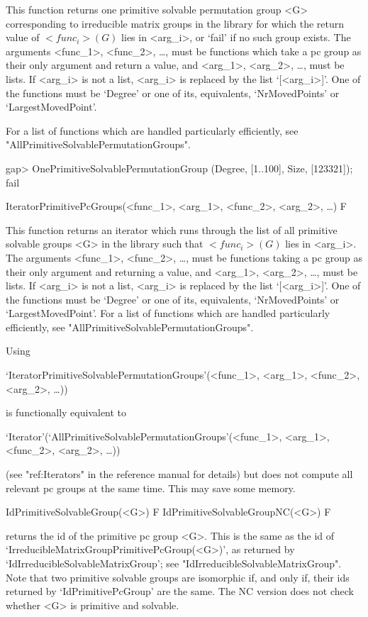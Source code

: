 This function returns one primitive solvable permutation
group <G> corresponding to irreducible matrix groups in the  {\IRREDSOL} library 
for which the return value of $<func_i>(G)$ lies in
<arg_i>, or `fail' if no such group exists.  The arguments <func_1>, <func_2>, \dots,
must be {\GAP} functions which take a pc group as their only argument and return a
value, and <arg_1>, <arg_2>,
\dots,  must be lists. If <arg_i> is not a list, <arg_i> is replaced by the list
`[<arg_i>]'. One of the functions must be `Degree' or one of its, equivalents, `NrMovedPoints' or `LargestMovedPoint'.

For a list of functions which are handled particularly efficiently, see
"AllPrimitiveSolvablePermutationGroups".

\beginexample
gap> OnePrimitiveSolvablePermutationGroup (Degree, [1..100], Size, [123321]);
fail
\endexample

\>IteratorPrimitivePcGroups(<func_1>, <arg_1>, <func_2>, <arg_2>, \dots) F

This function returns an iterator which runs through the list of all primitive solvable
groups <G> in the  {\IRREDSOL} library such that
$<func_i>(G)$ lies in <arg_i>. The arguments <func_1>, <func_2>, \dots,
must be {\GAP} functions taking a pc group as their only argument and returning 
a value, and <arg_1>, <arg_2>, \dots, 
must be lists. If <arg_i> is not a list, <arg_i> is replaced by the list `[<arg_i>]'.
One of the functions must be `Degree' or one of its, equivalents, `NrMovedPoints' 
or `LargestMovedPoint'.
For a list of functions which are handled particularly efficiently, see
"AllPrimitiveSolvablePermutationGroups".

Using 

`IteratorPrimitiveSolvablePermutationGroups'(<func_1>, <arg_1>, <func_2>, <arg_2>, \dots)) 

is functionally equivalent to 

`Iterator'(`AllPrimitiveSolvablePermutationGroups'(<func_1>, <arg_1>, <func_2>, <arg_2>, \dots))

(see "ref:Iterators" in the {\GAP} reference manual for details) but does not 
compute all relevant pc groups at the same time. 
This may save some memory. 


\>IdPrimitiveSolvableGroup(<G>) F
\>IdPrimitiveSolvableGroupNC(<G>) F

returns the id of the primitive pc group <G>. This is the same as
the id of `IrreducibleMatrixGroupPrimitivePcGroup(<G>)', as returned by
`IdIrreducibleSolvableMatrixGroup'; see "IdIrreducibleSolvableMatrixGroup".
Note that two primitive solvable groups are isomorphic if, and only if, their
ids returned by `IdPrimitivePcGroup' are the same. The NC version does not
check whether <G> is primitive and solvable.

